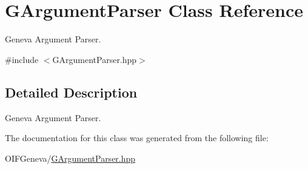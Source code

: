 \hypertarget{classGArgumentParser}{
\section{GArgumentParser Class Reference}
\label{d0/d39/classGArgumentParser}
}


Geneva Argument Parser.  




{\ttfamily \#include $<$GArgumentParser.hpp$>$}



\subsection{Detailed Description}
Geneva Argument Parser. 

The documentation for this class was generated from the following file:\begin{DoxyCompactItemize}
\item 
OIFGeneva/\hyperlink{GArgumentParser_8hpp}{GArgumentParser.hpp}\end{DoxyCompactItemize}
